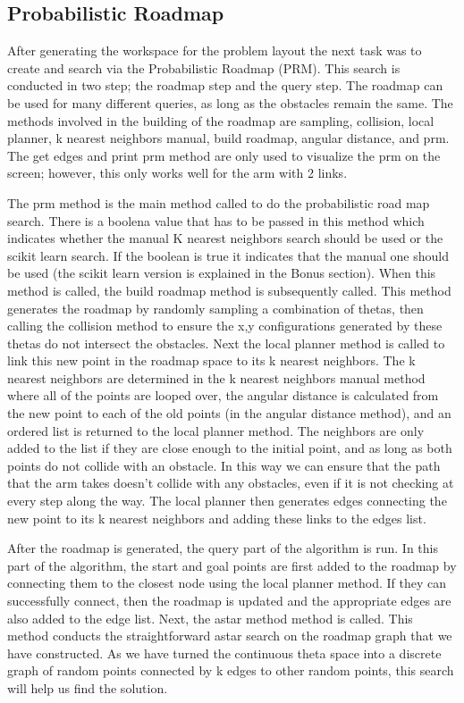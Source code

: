 \documentclass{article}
\begin{document}
\subsection{Probabilistic Roadmap}
After generating the workspace for the problem layout the next task was to create and search via the Probabilistic Roadmap (PRM). This search is conducted in two step; the roadmap step and the query step. The roadmap can be used for many different queries, as long as the obstacles remain the same. The methods involved in the building of the roadmap are sampling, collision, local planner, k nearest neighbors manual, build roadmap, angular distance, and prm. The get edges and print prm method are only used to visualize the prm on the screen; however, this only works well for the arm with 2 links. 

The prm method is the main method called to do the probabilistic road map search. There is a boolena value that has to be passed in this method which indicates whether the manual K nearest neighbors search should be used or the scikit learn search. If the boolean is true it indicates that the manual one should be used (the scikit learn version is explained in the Bonus section). When this method is called, the build roadmap method is subsequently called. This method generates the roadmap by randomly sampling a combination of thetas, then calling the collision method to ensure the x,y configurations generated by these thetas do not intersect the obstacles. Next the local planner method is called to link this new point in the roadmap space to its k nearest neighbors. The k nearest neighbors are determined in the k nearest neighbors manual method where all of the points are looped over, the angular distance is calculated from the new point to each of the old points (in the angular distance method), and an ordered list is returned to the local planner method. The neighbors are only added to the list if they are close enough to the initial point, and as long as both points do not collide with an obstacle. In this way we can ensure that the path that the arm takes doesn't collide with any obstacles, even if it is not checking at every step along the way. The local planner then generates edges connecting the new point to its k nearest neighbors and adding these links to the edges list. 

After the roadmap is generated, the query part of the algorithm is run. In this part of the algorithm, the start and goal points are first added  to the roadmap by connecting them to the closest node using the local planner method. If they can successfully connect, then the roadmap is updated and the appropriate edges are also added to the edge list. Next, the astar method method is called. This method conducts the straightforward astar search on the roadmap graph that we have constructed. As we have turned the continuous theta space into a discrete graph of random points connected by k edges to other random points, this search will help us find the solution. 
\end{document}
